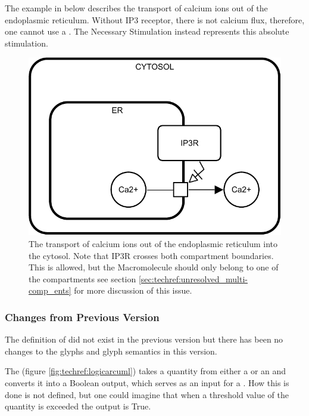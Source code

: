 The example in  below describes the
transport of calcium ions out of the endoplasmic reticulum. Without
IP3 receptor, there is not calcium flux, therefore, one cannot use a
. The Necessary Stimulation instead represents this
absolute stimulation.

\begin{figure}[htb]
  \centering
  \includegraphics[scale = 0.3]{examples/necessary_stim-transport}
  \caption{The transport of calcium ions out of the endoplasmic
    reticulum into the cytosol. Note that IP3R crosses both
    compartment boundaries. This is allowed, but the Macromolecule
    should only belong to one of the compartments see section
    \ref{sec:techref:unresolved_multi-comp_ents} for more discussion of this
    issue.}
  \label{fig:techref:necessary_stim-calcium}
\end{figure}

\subsubsection{Changes from Previous Version}

The definition of  did not exist in the
previous version but there has been no changes to the glyphs and glyph
semantics in this version.

\label{defn:LogicArc}

The  (figure \ref{fig:techref:logicarcuml}) takes a quantity from either a
 or an  and
converts it into a Boolean output, which serves as an input for a
. How this is done is not defined, but one
could imagine that when a threshold value of the quantity is exceeded
the output is True.

